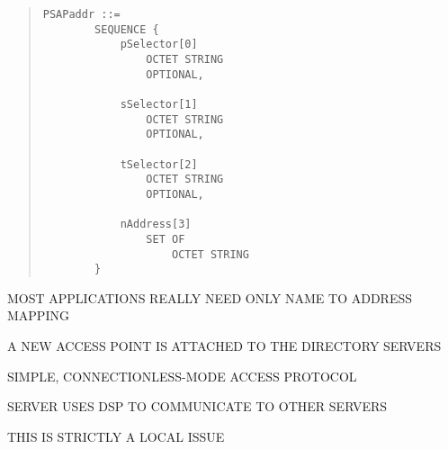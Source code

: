 \begin{bwslide}

\begin{quote}\smaller\begin{verbatim}
PSAPaddr ::=
        SEQUENCE {
            pSelector[0]
                OCTET STRING
                OPTIONAL,

            sSelector[1]
                OCTET STRING
                OPTIONAL,

            tSelector[2]
                OCTET STRING
                OPTIONAL,

            nAddress[3]
                SET OF
                    OCTET STRING
        }
\end{verbatim}\end{quote}
\end{bwslide}


%


\begin{bwslide}

\begin{nrtc}
\item	MOST APPLICATIONS REALLY NEED ONLY NAME TO ADDRESS MAPPING
\item	A NEW ACCESS POINT IS ATTACHED TO THE DIRECTORY SERVERS
	\begin{nrtc}
	\item	SIMPLE, CONNECTIONLESS-MODE ACCESS PROTOCOL 
	\item	SERVER USES DSP TO COMMUNICATE TO OTHER SERVERS
	\end{nrtc}
\item	THIS IS STRICTLY A LOCAL ISSUE
\end{nrtc}
\end{bwslide}


